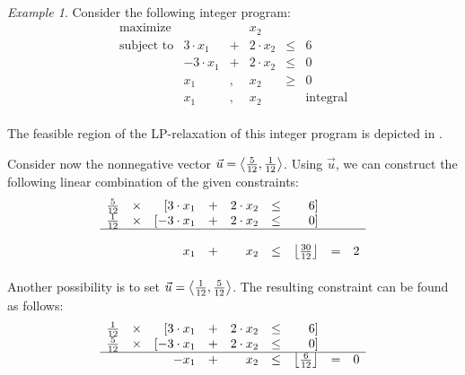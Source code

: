 \documentclass[titlepage]{book}
\theoremstyle{plain}
\theoremstyle{definition}
\theoremstyle{remark}
\newtheorem{example}{Example}
\begin{document}
\paragraph{}
\begin{example}
Consider the following integer program:
\begin{equation}
\begin{array}{rrcrcr}
\mbox{maximize}&&&x_2\\
\mbox{subject to}&3\cdot x_1&+&2\cdot x_2&\leq&6\\
&-3\cdot x_1&+&2\cdot x_2&\leq&0\\
&x_1&,&x_2&\geq&0\\
&x_1&,&x_2&&\mbox{integral}
\end{array}
\end{equation}

\paragraph{}
The feasible region of the LP-relaxation of this integer program is depicted in .



Consider now the nonnegative vector $\vec{u}=\left\langle \frac{5}{12},\frac{1}{12} \right\rangle$. Using $\vec{u}$, we can construct the following linear combination of the given constraints:
\begin{equation}
\begin{array}{rcrcrcrcr}
\tfrac{5}{12}&\times&[3\cdot x_1&+&2\cdot x_2&\leq&6]&&\\
\tfrac{1}{12}&\times&[-3\cdot x_1&+&2\cdot x_2&\leq&0]&&\\\hline\\
&&x_1&+&x_2&\leq&\left\lfloor \frac{30}{12} \right\rfloor&=&2
\end{array}
\end{equation}

\paragraph{}
Another possibility is to set $\vec{u}=\left\langle \frac{1}{12},\frac{5}{12} \right\rangle$. The resulting constraint can be found as follows:
\begin{equation}
\begin{array}{rcrcrcrcr}
\tfrac{1}{12}&\times&[3\cdot x_1&+&2\cdot x_2&\leq&6]&&\\
\tfrac{5}{12}&\times&[-3\cdot x_1&+&2\cdot x_2&\leq&0]&&\\\hline
&&-x_1&+&x_2&\leq&\left\lfloor \tfrac{6}{12} \right\rfloor&=&0
\end{array}
\end{equation}


\end{example}
\end{document}
